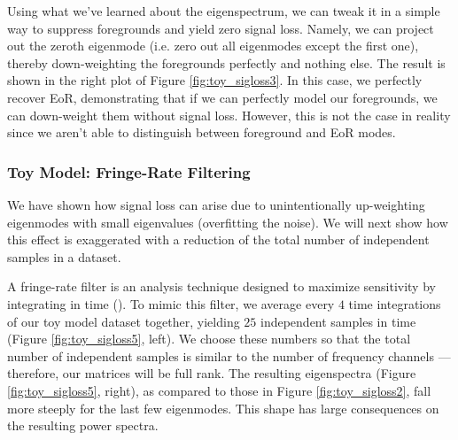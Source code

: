 \documentclass[preprint2,numberedappendix,tighten,twocolappendix]{aastex6}  %
\begin{document}
Using what we've learned about the eigenspectrum, we can tweak it in a simple way to suppress foregrounds and yield zero signal loss. Namely, we can project out the zeroth eigenmode (i.e. zero out all eigenmodes except the first one), thereby down-weighting the foregrounds perfectly and nothing else. The result is shown in the right plot of Figure \ref{fig:toy_sigloss3}. In this case, we perfectly recover EoR, demonstrating that if we can perfectly model our foregrounds, we can down-weight them without signal loss. However, this is not the case in reality since we aren't able to distinguish between foreground and EoR modes.

\subsubsection{Toy Model: Fringe-Rate Filtering}

We have shown how signal loss can arise due to unintentionally up-weighting eigenmodes with small eigenvalues (overfitting the noise). We will next show how this effect is exaggerated with a reduction of the total number of independent samples in a dataset. 

A fringe-rate filter is an analysis technique designed to maximize sensitivity by integrating in time (\citealt{parsons_et_al2016}). To mimic this filter, we average every $4$ time integrations of our toy model dataset together, yielding $25$ independent samples in time (Figure \ref{fig:toy_sigloss5}, left). We choose these numbers so that the total number of independent samples is similar to the number of frequency channels --- therefore, our matrices will be full rank. The resulting eigenspectra (Figure \ref{fig:toy_sigloss5}, right), as compared to those in Figure \ref{fig:toy_sigloss2}, fall more steeply for the last few eigenmodes. This shape has large consequences on the resulting power spectra.
\end{document}
